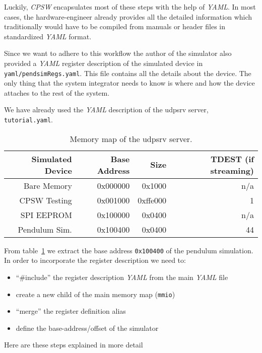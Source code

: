 \documentclass[10pt]{article}
\newcommand{\ita}[1]{\emph{#1}}
\newcommand{\cpsw}      {\ita {CPSW}}
\newcommand{\yaml}      {\ita {YAML}}
\newcommand{\udps}      {udpsrv}
\newcommand{\cod}[1] {{\tt#1}}
\newcommand{\tutyaml} {\cod{tutorial.yaml}}
\newcounter{tbls}
\begin{document}
Luckily, \cpsw{} encapsulates most of these steps with the help of \yaml{}. In most
cases, the hardware-engineer already provides all the detailed information which
traditionally would have to be compiled from manuals or header files in standardized
\yaml{} format.

Since we want to adhere to this workflow the author of the simulator also provided
a \yaml{} register description of the simulated device in \cod{yaml/pendsimRegs.yaml}.
This file contains all the details about the device. The only thing that the system
integrator needs to know is where and how the device attaches to the rest of the system.

We have already used the \yaml{} description of the \udps{} server, \tutyaml{}.
\begin{table}[ht]
\label{tbl:udpsmap}
\hspace*{\fill}
\begin{tabular}{rrrr}
    Simulated Device & Base Address & Size & TDEST (if streaming) \\
\hline
    Bare Memory      & 0x000000     & 0x1000   & n/a \\
    CPSW Testing     & 0x001000     & 0xffe000 &   1 \\
    SPI EEPROM       & 0x100000     & 0x0400   & n/a \\
    Pendulum Sim.    & 0x100400     & 0x0400   &  44 \\
\end{tabular}
\hspace*{\fill}
\caption{Memory map of the \udps{} server.}
\end{table}
From table~\ref{tbl:udpsmap} we extract the base address \cod{0x100400} of the
pendulum simulation. In order to incorporate the register description we need
to:
\begin{itemize}
\item ``\#include'' the register description \yaml{} from the main \yaml{} file
\item create a new child of the main memory map (\cod{mmio})
\item ``merge'' the register definition alias
\item define the base-address/offset of the simulator
\end{itemize}

Here are these steps explained in more detail
\end{document}
